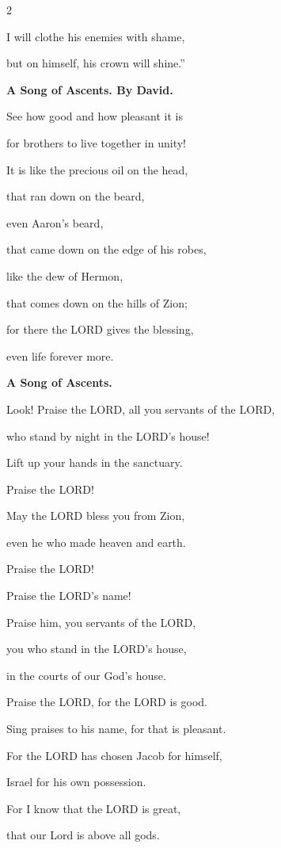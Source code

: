 \begin{multicols}{2}
	
	\myverse{}I will clothe his enemies with shame,
	
	but on himself, his crown will shine.”
	
	
	\mychapter{}\textbf{A Song of Ascents. By David.}
	
	\quad\quad\quad \myverse*{}See how good and how pleasant it is
	
	for brothers to live together in unity!
	
	
	\myverse{}It is like the precious oil on the head,
	
	that ran down on the beard,
	
	even Aaron’s beard,
	
	that came down on the edge of his robes,
	
	
	\myverse{}like the dew of Hermon,
	
	that comes down on the hills of Zion;
	
	for there the LORD gives the blessing,
	
	even life forever more.
	
	
	\mychapter{}\textbf{A Song of Ascents.}
	
	\quad\quad\quad \myverse*{}Look! Praise the LORD, all you servants of the LORD,
	
	who stand by night in the LORD’s house!
	
	
	\myverse{}Lift up your hands in the sanctuary.
	
	Praise the LORD!
	
	
	\myverse{}May the LORD bless you from Zion,
	
	even he who made heaven and earth.
	
	
	\mychapter{} \myverse*{}Praise the LORD!
	
	\quad\quad\quad Praise the LORD’s name!
	
	Praise him, you servants of the LORD,
	
	
	\myverse{}you who stand in the LORD’s house,
	
	in the courts of our God’s house.
	
	
	\myverse{}Praise the LORD, for the LORD is good.
	
	Sing praises to his name, for that is pleasant.
	
	
	\myverse{}For the LORD has chosen Jacob for himself,
	
	Israel for his own possession.
	
	
	\myverse{}For I know that the LORD is great,
	
	that our Lord is above all gods.
	

\end{multicols}
